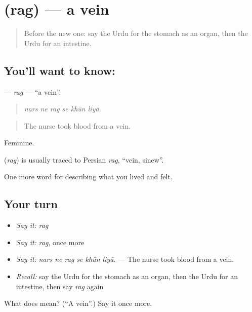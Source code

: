 \section[\texorpdfstring{\ur{رگ} (rag)}{رگ (rag)}]{ (rag) — a vein}

\label{lesson:UR-C464-rag}



\begin{quote}
Before the new one: say the Urdu for the stomach as an organ, then the Urdu for an intestine.
\end{quote}

\subsection*{You'll want to know: }
\textbf{} — \emph{rag} — \textquotedblleft{}a vein\textquotedblright{}.

\begin{quote}
     
\end{quote}

\begin{quote}
\emph{nars ne rag se khūn liyā.}
\end{quote}

\begin{quote}
The nurse took blood from a vein.
\end{quote}

Feminine.

\begin{cousinweb}
\textbf{} (\emph{rag}) is usually traced to Persian \emph{rag}, \textquotedblleft{}vein, sinew\textquotedblright{}.
\end{cousinweb}

\begin{grammarlens}[title={What you've built}]
One more word for describing what you lived and felt.
\end{grammarlens}

\subsection*{Your turn}
\begin{itemize}
\raggedright
  \item \emph{Say it:} \emph{rag}
  \item \emph{Say it:} \emph{rag}, once more
  \item \emph{Say it:} \emph{nars ne rag se khūn liyā.} — The nurse took blood from a vein.
  \item \emph{Recall:} say the Urdu for the stomach as an organ, then the Urdu for an intestine, then say \emph{rag} again
\end{itemize}

\begin{tcolorbox}[breakable,colback=teal!4,colframe=teal!35!black,title={Before you move on}]
What does  mean? (\textquotedblleft{}A vein\textquotedblright{}.) Say it once more.
\end{tcolorbox}
